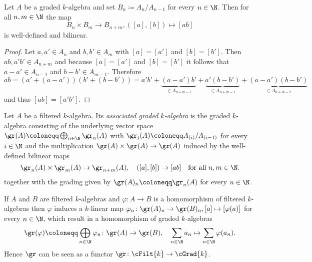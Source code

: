 \begin{lemma}
 Let $A$ be a graded $k$-algebra and set $B_n \coloneqq A_n/A_{n-1}$ for every $n \in \N$. Then for all $n,m \in \N$ the map
 \[
  B_n \times B_m \to B_{n+m}, ([a], [b]) \mapsto [ab]
 \]
 is well-defined and bilinear.
\end{lemma}
\begin{proof}
 Let $a, a' \in A_n$ and $b, b' \in A_m$ with $[a] = [a']$ and $[b] = [b']$. Then $ab, a'b' \in A_{n+m}$ and because $[a] = [a']$ and $[b] = [b']$ it follows that $a-a' \in A_{n-1}$ and $b-b' \in A_{m-1}$. Therefore
 \[
  ab
  = (a'+(a-a'))(b'+(b-b'))
  = a'b' + \underbrace{(a-a')b'}_{\in A_{n+m-1}} + \underbrace{a'(b-b')}_{\in A_{n+m-1}} + \underbrace{(a-a')(b-b')}_{\in A_{n+m-2}}
 \]
 and thus $[ab] = [a'b']$.
\end{proof}


\begin{definition}
 Let $A$ be a filtered $k$-algebra. Its \emph{associated graded $k$-algebra} is the graded $k$-algebra consisting of the underlying vector space $\gr(A) \coloneqq \bigoplus_{n \in \N} \gr_n(A)$ with $\gr_i(A) \coloneqq A_{(i)} / A_{(i-1)}$ for every $i \in \N$ and the multiplication $\gr(A) \times \gr(A) \to \gr(A)$ induced by the well-defined bilinear maps
 \[
  \gr_n(A) \times \gr_m(A) \to \gr_{n+m}(A), \quad
  ([a],[b]) \to [ab]
  \quad\text{for all $n,m \in \N$}.
 \]
 together with the grading given by $\gr(A)_n \coloneqq \gr_n(A)$ for every $n \in \N$.
\end{definition}


\begin{remark}
 If $A$ and $B$ are filtered $k$-algebras and $\varphi \colon A \to B$ is a homomorphism of filtered $k$-algebras then $\varphi$ induces a $k$-linear map $\varphi_n \colon \gr(A)_n \to \gr(B)_n, [a] \mapsto [\varphi(a)]$ for every $n \in \N$, which result in a homomorphism of graded $k$-algebras
 \[
  \gr(\varphi) \coloneqq \bigoplus_{n \in \N} \varphi_n \colon \gr(A) \to \gr(B),
  \quad
  \sum_{n \in \N} a_n \mapsto \sum_{n \in \N} \varphi(a_n).
 \]
 Hence $\gr$ can be seen as a functor $\gr \colon \cFilt{k} \to \cGrad{k}$.
\end{remark}


